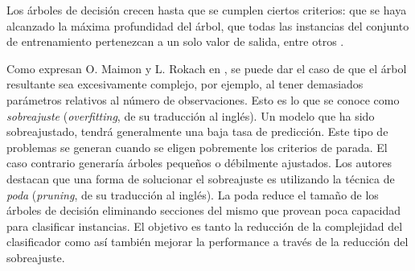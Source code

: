 	Los árboles de decisión crecen hasta que se cumplen ciertos criterios: que se haya alcanzado la máxima profundidad del árbol, que todas las instancias del conjunto de entrenamiento pertenezcan a un solo valor de salida, entre otros \cite{LROM10}.

	Como expresan O. Maimon y L. Rokach en \cite{LROM10}, se puede dar el caso de que el árbol resultante sea excesivamente complejo, por ejemplo, al tener demasiados parámetros relativos al número de observaciones. Esto es lo que se conoce como \textit{sobreajuste} (\textit{overfitting}, de su traducción al inglés). Un modelo que ha sido sobreajustado, tendrá generalmente una baja tasa de predicción. Este tipo de problemas se generan cuando se eligen pobremente los criterios de parada. El caso contrario generaría árboles pequeños o débilmente ajustados. Los autores destacan que una forma de solucionar el sobreajuste es utilizando la técnica de \textit{poda} (\textit{pruning}, de su traducción al inglés). La poda reduce el tamaño de los árboles de decisión eliminando secciones del mismo que provean poca capacidad para clasificar instancias. El objetivo es tanto la reducción de la complejidad del clasificador como así también mejorar la performance a través de la reducción del sobreajuste.
	
